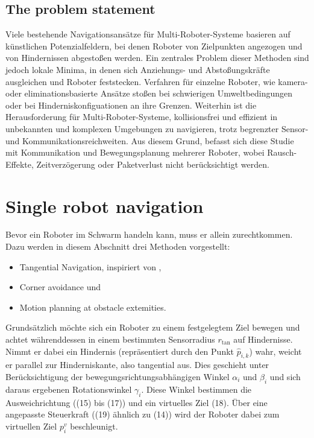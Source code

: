 \documentclass[conference]{IEEEtran}
\begin{document}
\subsection*{The problem statement}
Viele bestehende Navigationsansätze für Multi-Roboter-Systeme basieren auf künstlichen 
Potenzialfeldern, bei denen Roboter von Zielpunkten angezogen und von Hindernissen 
abgestoßen werden. Ein zentrales Problem dieser Methoden sind jedoch lokale Minima, in 
denen sich Anziehungs- und Abstoßungskräfte ausgleichen und Roboter feststecken. 
Verfahren für einzelne Roboter, wie kamera- oder eliminationsbasierte Ansätze stoßen bei 
schwierigen Umweltbedingungen oder bei Hinderniskonfiguationen an ihre Grenzen.
Weiterhin ist die Herausforderung für Multi-Roboter-Systeme, kollisionsfrei und 
effizient in unbekannten und komplexen Umgebungen zu navigieren, trotz begrenzter 
Sensor- und Kommunikationsreichweiten. 
Aus diesem Grund, befasst sich diese Studie mit Kommunikation und Bewegungsplanung mehrerer Roboter,
wobei Rausch-Effekte, Zeitverzögerung oder Paketverlust nicht berücksichtigt werden.


\section{Single robot navigation}
\label{sec:Single robot navigation}
Bevor ein Roboter im Schwarm handeln kann, muss er allein zurechtkommen. Dazu 
werden in diesem Abschnitt drei Methoden vorgestellt:
\begin{itemize}
    \item Tangential Navigation, inspiriert von \cite{Brandao.2013},
    \item Corner avoidance und
    \item Motion planning at obstacle extemities.
\end{itemize}

Grundsätzlich möchte sich ein Roboter zu einem festgelegtem Ziel bewegen und achtet 
währenddessen in einem bestimmten Sensorradius \(r_{\mathrm{tan}}\) auf Hindernisse. Nimmt 
er dabei ein Hindernis (repräsentiert durch den Punkt \( \hat{p}_{i,k} \)) wahr, weicht 
er parallel zur Hinderniskante, also tangential aus. Dies geschieht unter Berücksichtigung der bewegungsrichtungsabhängigen Winkel \( \alpha_i \) und 
\( \beta_i \) und sich daraus ergebenen Rotationswinkel \( \gamma_i \). Diese Winkel bestimmen die Ausweichrichtung 
((15) bis (17)) und ein virtuelles Ziel (18). Über eine angepasste Steuerkraft 
((19) ähnlich zu (14)) wird der Roboter dabei zum virtuellen Ziel $p_i^v$ beschleunigt.
\end{document}
